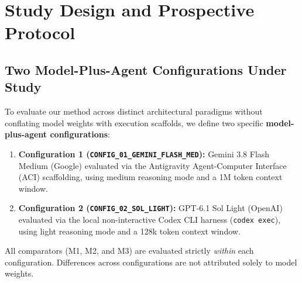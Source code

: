 \documentclass[runningheads]{llncs}
\begin{document}
\section{Study Design and Prospective Protocol}
\label{sec:study_design}

\subsection{Two Model-Plus-Agent Configurations Under Study}
To evaluate our method across distinct architectural paradigms without conflating model weights with execution scaffolds, we define two specific \textbf{model-plus-agent configurations}:
\begin{enumerate}[leftmargin=*]
    \item \textbf{Configuration 1 (\texttt{CONFIG\_01\_GEMINI\_FLASH\_MED}):} Gemini 3.8 Flash Medium (Google) evaluated via the Antigravity Agent-Computer Interface (ACI) scaffolding, using medium reasoning mode and a 1M token context window.
    \item \textbf{Configuration 2 (\texttt{CONFIG\_02\_SOL\_LIGHT}):} GPT-6.1 Sol Light (OpenAI) evaluated via the local non-interactive Codex CLI harness (\texttt{codex exec}), using light reasoning mode and a 128k token context window.
\end{enumerate}
All comparators (M1, M2, and M3) are evaluated strictly \emph{within} each configuration. Differences across configurations are not attributed solely to model weights.
\end{document}
